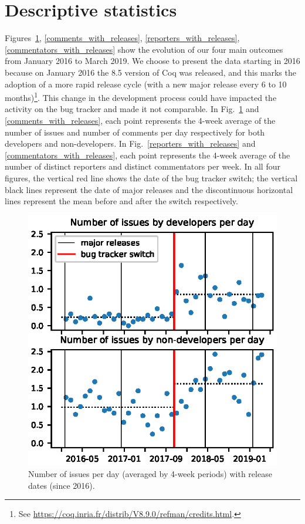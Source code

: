 \documentclass[conference]{IEEEtran}
\begin{document}
\section{Descriptive statistics}
\label{descriptive-stats}

Figures~\ref{bug_nb_with_releases}, \ref{comments_with_releases}, \ref{reporters_with_releases}, \ref{commentators_with_releases} show the evolution of our four main outcomes from January 2016 to March 2019. We choose to present the data starting in 2016 because on January 2016 the 8.5 version of Coq was released, and this marks the adoption of a more rapid release cycle (with a new major release every 6 to 10 months)\footnote{See \url{https://coq.inria.fr/distrib/V8.9.0/refman/credits.html}.}. This change in the development process could have impacted the activity on the bug tracker and made it not comparable. In Fig.~\ref{bug_nb_with_releases} and \ref{comments_with_releases}, each point represents the 4-week average of the number of issues and number of comments per day respectively for both developers and non-developers. In Fig.~\ref{reporters_with_releases} and \ref{commentators_with_releases}, each point represents the 4-week average of the number of distinct reporters and distinct commentators per week. In all four figures, the vertical red line shows the date of the bug tracker switch; the vertical black lines represent the date of major releases and the discontinuous horizontal lines represent the mean before and after the switch respectively. 

\begin{figure}
\includegraphics{bug_nb_with_releases.eps}
\caption{Number of issues per day (averaged by 4-week periods) with release dates (since 2016).} \label{bug_nb_with_releases}
\end{figure}
\end{document}
